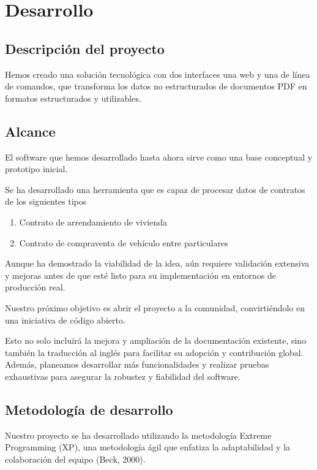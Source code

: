 \chapter{Desarrollo}\label{ch:chapter_3}


\section{Descripción del proyecto}

Hemos creado una solución tecnológica con dos interfaces una web y una de línea de comandos, que transforma los datos no
estructurados de documentos PDF en formatos estructurados y utilizables.


\section{Alcance}

El software que hemos desarrollado hasta ahora sirve como una base conceptual y prototipo inicial.

Se ha desarrollado una herramienta que es capaz de procesar datos de contratos de los siguientes tipos

\begin{enumerate}
    \item Contrato de arrendamiento de vivienda
    \item Contrato de compraventa de vehículo entre particulares
\end{enumerate}

Aunque ha demostrado la viabilidad de la idea, aún requiere validación extensiva y mejoras antes de que esté listo para
su implementación en entornos de producción real.

Nuestro próximo objetivo es abrir el proyecto a la comunidad, convirtiéndolo en una iniciativa de código abierto.

Esto no solo incluirá la mejora y ampliación de la documentación existente, sino también la traducción al inglés para
facilitar su adopción y contribución global. Además, planeamos desarrollar
más funcionalidades y realizar pruebas exhaustivas para asegurar la robustez y fiabilidad del software.


\section{Metodología de desarrollo}

Nuestro proyecto se ha desarrollado utilizando la metodología Extreme
Programming (XP), una metodología ágil que enfatiza la adaptabilidad y la colaboración del equipo (Beck, 2000).

